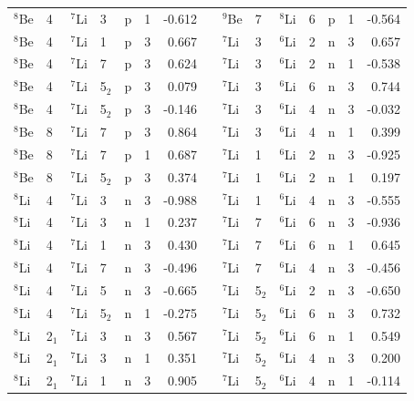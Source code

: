 \documentclass[10pt]{iopart}
\begin{document}
\begin{table}[tp]
\begin{tabular*}{\textwidth}{@{\extracolsep{\fill}}llllllrl@{\extracolsep{\fill}}llllllr@{\extracolsep{\fill}}}
$^8$Be  & 4  & $^7$Li   & 3   & p       & 1   & -0.612 &  & $^9$Be  & 7  & $^8$Li    & 6   & p       & 1   & -0.564  \\
$^8$Be  & 4  & $^7$Li   & 1   & p       & 3   & 0.667  &  & $^7$Li  & 3  & $^6$Li   & 2   & n       & 3   & 0.657   \\
$^8$Be  & 4  & $^7$Li   & 7   & p       & 3   & 0.624  &  & $^7$Li  & 3  & $^6$Li   & 2   & n       & 1   & -0.538  \\
$^8$Be  & 4  & $^7$Li   & 5$_2$   & p       & 3   & 0.079  &  & $^7$Li  & 3  & $^6$Li   & 6   & n       & 3   & 0.744   \\
$^8$Be  & 4  & $^7$Li   & 5$_2$   & p       & 3   & -0.146 &  & $^7$Li  & 3  & $^6$Li   & 4   & n       & 3   & -0.032  \\
$^8$Be  & 8  & $^7$Li   & 7   & p       & 3   & 0.864  &  & $^7$Li  & 3  & $^6$Li   & 4   & n       & 1   & 0.399   \\
$^8$Be  & 8  & $^7$Li   & 7   & p       & 1   & 0.687  &  & $^7$Li  & 1  & $^6$Li   & 2   & n       & 3   & -0.925  \\
$^8$Be  & 8  & $^7$Li   & 5$_2$   & p       & 3   & 0.374  &  & $^7$Li  & 1  & $^6$Li   & 2   & n       & 1   & 0.197   \\
$^8$Li  & 4  & $^7$Li   & 3   & n       & 3   & -0.988 &  & $^7$Li  & 1  & $^6$Li   & 4   & n       & 3   & -0.555  \\
$^8$Li  & 4  & $^7$Li   & 3   & n       & 1   & 0.237  &  & $^7$Li  & 7  & $^6$Li   & 6   & n       & 3   & -0.936  \\
$^8$Li  & 4  & $^7$Li   & 1   & n       & 3   & 0.430   &  & $^7$Li  & 7  & $^6$Li   & 6   & n       & 1   & 0.645   \\
$^8$Li  & 4  & $^7$Li   & 7   & n       & 3   & -0.496 &  & $^7$Li  & 7  & $^6$Li   & 4   & n       & 3   & -0.456  \\
$^8$Li  & 4  & $^7$Li   & 5   & n       & 3   & -0.665 &  & $^7$Li  & 5$_2$  & $^6$Li   & 2   & n       & 3   & -0.650   \\
$^8$Li  & 4  & $^7$Li   & 5$_2$   & n       & 1   & -0.275 &  & $^7$Li  & 5$_2$  & $^6$Li   & 6   & n       & 3   & 0.732   \\
$^8$Li  & 2$_1$  & $^7$Li   & 3   & n       & 3   & 0.567  &  & $^7$Li  & 5$_2$  & $^6$Li   & 6   & n       & 1   & 0.549   \\
$^8$Li  & 2$_1$  & $^7$Li   & 3   & n       & 1   & 0.351  &  & $^7$Li  & 5$_2$  & $^6$Li   & 4   & n       & 3   & 0.200     \\
$^8$Li  & 2$_1$  & $^7$Li   & 1   & n       & 3   & 0.905  &  & $^7$Li  & 5$_2$  & $^6$Li   & 4   & n       & 1   & -0.114  \\

\end{tabular*}
\end{table}
\end{document}
